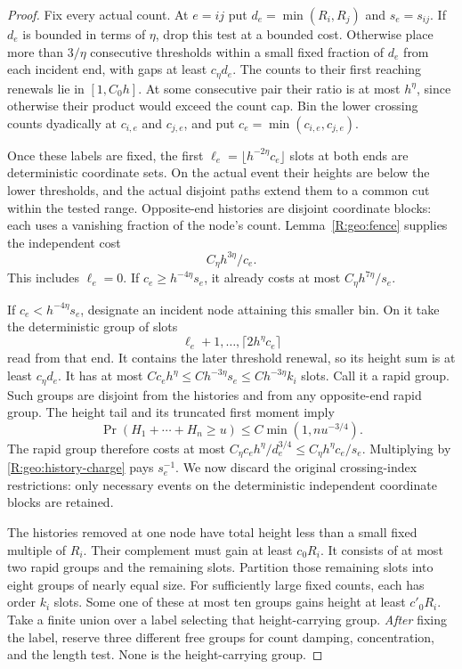 \begin{proof}
Fix every actual count.  At $e=ij$ put $d_e=\min(R_i,R_j)$ and
$s_e=s_{ij}$.  If $d_e$ is bounded in terms of $\eta$, drop this test
at a bounded cost.  Otherwise place more than $3/\eta$ consecutive
thresholds within a small fixed fraction of $d_e$ from each incident
end, with gaps at least $c_\eta d_e$.  The counts to their first
reaching renewals lie in $[1,C_0h]$.  At some consecutive pair their
ratio is at most $h^\eta$, since otherwise their product would exceed
the count cap.  Bin the lower crossing counts dyadically at $c_{i,e}$
and $c_{j,e}$, and put $c_e=\min(c_{i,e},c_{j,e})$.

Once these labels are fixed, the first
$\ell_e=\lfloor h^{-2\eta}c_e\rfloor$ slots at both ends are
deterministic coordinate sets.  On the actual event their heights are
below the lower thresholds, and the actual disjoint paths extend them
to a common cut within the tested range.  Opposite-end histories are
disjoint coordinate blocks: each uses a vanishing fraction of the
node's count.  Lemma~\ref{R:geo:fence} supplies the independent cost
\begin{equation}\label{R:geo:history-charge}
                        C_\eta h^{3\eta}/c_e.
\end{equation}
This includes $\ell_e=0$.  If $c_e\ge h^{-4\eta}s_e$, it already
costs at most $C_\eta h^{7\eta}/s_e$.

If $c_e<h^{-4\eta}s_e$, designate an incident node attaining this
smaller bin.  On it take the deterministic group of slots
\[
                    \ell_e+1,\ldots,\lceil2h^\eta c_e\rceil
\]
read from that end.  It contains the later threshold renewal, so its
height sum is at least $c_\eta d_e$.  It has at most
$C c_eh^\eta\le C h^{-3\eta}s_e\le C h^{-3\eta}k_i$ slots.
Call it a rapid group.  Such groups are disjoint from the histories and
from any opposite-end rapid group.  The height tail and its truncated
first moment imply
\begin{equation}\label{R:geo:sum-tail}
 \Pr(H_1+\cdots+H_n\ge u)\le C\min(1,n u^{-3/4}).
\end{equation}
The rapid group therefore costs at most
$C_\eta c_eh^\eta/d_e^{3/4}\le C_\eta h^\eta c_e/s_e$.
Multiplying by \eqref{R:geo:history-charge} pays $s_e^{-1}$.
We now discard the original crossing-index restrictions: only necessary
events on the deterministic independent coordinate blocks are retained.

The histories removed at one node have total height less than a small
fixed multiple of $R_i$.  Their complement must gain at least $c_0R_i$.
It consists of at most two rapid groups and the remaining slots.
Partition those remaining slots into eight groups of nearly equal size.
For sufficiently large fixed counts, each has order $k_i$ slots.
Some one of these at most ten groups gains height at least $c'_0R_i$.
Take a finite union over a label selecting that height-carrying group.
\emph{After} fixing the label, reserve three different free groups for
count damping, concentration, and the length test.  None is the
height-carrying group.


\end{proof}
